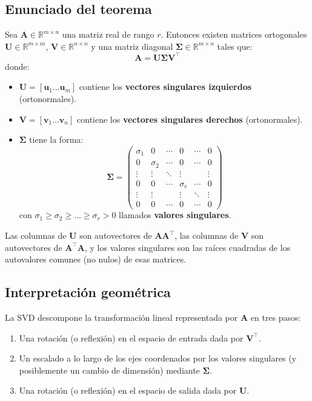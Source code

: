 \documentclass[12pt,a4paper,openany,oneside]{book}
\begin{document}
\subsection{Enunciado del teorema}
Sea $\mathbf{A} \in \mathbb{R}^{m \times n}$ una matriz real de rango $r$. Entonces existen matrices ortogonales $\mathbf{U} \in \mathbb{R}^{m \times m}$, $\mathbf{V} \in \mathbb{R}^{n \times n}$ y una matriz diagonal $\boldsymbol{\Sigma} \in \mathbb{R}^{m \times n}$ tales que:
\[
\mathbf{A} = \mathbf{U} \boldsymbol{\Sigma} \mathbf{V}^\top
\]
donde:
\begin{itemize}
    \item $\mathbf{U} = [\mathbf{u}_1 \dots \mathbf{u}_m]$ contiene los \textbf{vectores singulares izquierdos} (ortonormales).
    \item $\mathbf{V} = [\mathbf{v}_1 \dots \mathbf{v}_n]$ contiene los \textbf{vectores singulares derechos} (ortonormales).
    \item $\boldsymbol{\Sigma}$ tiene la forma:
    \[
    \boldsymbol{\Sigma} = \begin{pmatrix}
    \sigma_1 & 0 & \cdots & 0 & \cdots & 0 \\
    0 & \sigma_2 & \cdots & 0 & \cdots & 0 \\
    \vdots & \vdots & \ddots & \vdots & & \vdots \\
    0 & 0 & \cdots & \sigma_r & \cdots & 0 \\
    \vdots & \vdots & & \vdots & \ddots & \vdots \\
    0 & 0 & \cdots & 0 & \cdots & 0
    \end{pmatrix}
    \]
    con $\sigma_1 \ge \sigma_2 \ge \dots \ge \sigma_r > 0$ llamados \textbf{valores singulares}.
\end{itemize}
Las columnas de $\mathbf{U}$ son autovectores de $\mathbf{A}\mathbf{A}^\top$, las columnas de $\mathbf{V}$ son autovectores de $\mathbf{A}^\top\mathbf{A}$, y los valores singulares son las raíces cuadradas de los autovalores comunes (no nulos) de esas matrices.

\subsection{Interpretación geométrica}
La SVD descompone la transformación lineal representada por $\mathbf{A}$ en tres pasos:
\begin{enumerate}
    \item Una rotación (o reflexión) en el espacio de entrada dada por $\mathbf{V}^\top$.
    \item Un escalado a lo largo de los ejes coordenados por los valores singulares (y posiblemente un cambio de dimensión) mediante $\boldsymbol{\Sigma}$.
    \item Una rotación (o reflexión) en el espacio de salida dada por $\mathbf{U}$.
\end{enumerate}
\end{document}
